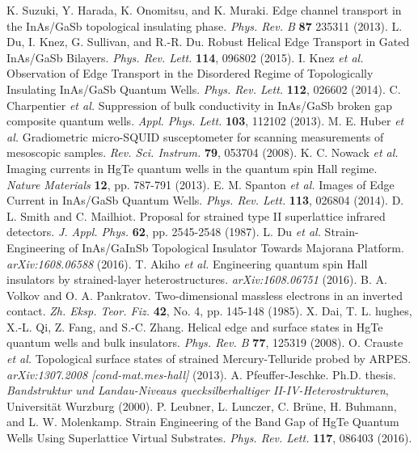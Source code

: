 \documentclass[titlepage,a4paper]{book}
\begin{document}
\begin{thebibliography}{199}
K. Suzuki, Y. Harada, K. Onomitsu, and K. Muraki. Edge channel transport in the InAs/GaSb topological insulating phase. \textit{Phys. Rev. B} \textbf{87} 235311 (2013).
L. Du, I. Knez, G. Sullivan, and R.-R. Du. Robust Helical Edge Transport in Gated InAs/GaSb Bilayers. \textit{Phys. Rev. Lett.} \textbf{114}, 096802 (2015).
I. Knez \textit{et al.} Observation of Edge Transport in the Disordered Regime of Topologically Insulating InAs/GaSb Quantum Wells. \textit{Phys. Rev. Lett.} \textbf{112}, 026602 (2014).
C. Charpentier \textit{et al.} Suppression of bulk conductivity in InAs/GaSb broken gap composite quantum wells. \textit{Appl. Phys. Lett.} \textbf{103}, 112102 (2013).
M. E. Huber \textit{et al.} Gradiometric micro-SQUID susceptometer for scanning measurements of mesoscopic samples. \textit{Rev. Sci. Instrum.} \textbf{79}, 053704 (2008).
K. C. Nowack \textit{et al.} Imaging currents in HgTe quantum wells in the quantum spin Hall regime. \textit{Nature Materials} \textbf{12}, pp. 787-791 (2013).
E. M. Spanton \textit{et al.} Images of Edge Current in InAs/GaSb Quantum Wells. \textit{Phys. Rev. Lett.} \textbf{113}, 026804 (2014).
D. L. Smith and C. Mailhiot. Proposal for strained type II superlattice infrared detectors. \textit{J. Appl. Phys.} \textbf{62}, pp. 2545-2548 (1987). 
L. Du \textit{et al.} Strain-Engineering of InAs/GaInSb Topological Insulator Towards Majorana Platform. \textit{arXiv:1608.06588} (2016).
T. Akiho \textit{et al.} Engineering quantum spin Hall insulators by strained-layer heterostructures. \textit{arXiv:1608.06751} (2016).
B. A. Volkov and O. A. Pankratov. Two-dimensional massless electrons in an inverted contact. \textit{Zh. Eksp. Teor. Fiz.} \textbf{42}, No. 4, pp. 145-148 (1985).
X. Dai, T. L. hughes, X.-L. Qi, Z. Fang, and S.-C. Zhang. Helical edge and surface states in HgTe quantum wells and bulk insulators. \textit{Phys. Rev. B} \textbf{77}, 125319 (2008). 
O. Crauste \textit{et al.} Topological surface states of strained Mercury-Telluride probed by ARPES. \textit{arXiv:1307.2008 [cond-mat.mes-hall]} (2013).
A. Pfeuffer-Jeschke. Ph.D. thesis. \textit{Bandstruktur und Landau-Niveaus quecksilberhaltiger II-IV-Heterostrukturen}, Universität Wurzburg (2000).
P. Leubner, L. Lunczer, C. Brüne, H. Buhmann, and L. W. Molenkamp. Strain Engineering of the Band Gap of HgTe Quantum Wells Using Superlattice Virtual Substrates. \textit{Phys. Rev. Lett.} \textbf{117}, 086403 (2016).

\end{thebibliography}
\end{document}
